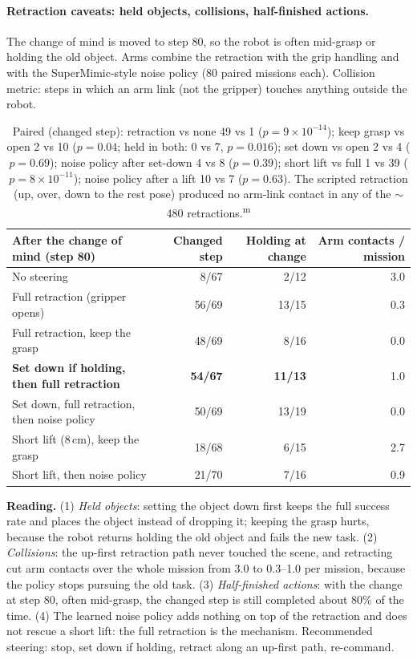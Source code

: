 \documentclass[10pt,a4paper]{article}
\DeclareRobustCommand{\meas}{\textsuperscript{\textcolor{green!50!black}{m}}}
\begin{document}
\paragraph{Retraction caveats: held objects, collisions, half-finished actions.} The change of mind is moved to step 80, so the robot is often mid-grasp or holding the old object. Arms combine the retraction with the grip handling and with the SuperMimic-style noise policy (80 paired missions each). Collision metric: steps in which an arm link (not the gripper) touches anything outside the robot.
\begin{table}[H]\centering\small
\begin{tabular}{p{6.4cm}rrr}
\toprule
After the change of mind (step 80) & Changed step & Holding at change & Arm contacts / mission \\
\midrule
No steering & 8/67 & 2/12 & 3.0 \\
Full retraction (gripper opens) & 56/69 & 13/15 & 0.3 \\
Full retraction, keep the grasp & 48/69 & 8/16 & 0.0 \\
\textbf{Set down if holding, then full retraction} & \textbf{54/67} & \textbf{11/13} & 1.0 \\
Set down, full retraction, then noise policy & 50/69 & 13/19 & 0.0 \\
Short lift (8\,cm), keep the grasp & 18/68 & 6/15 & 2.7 \\
Short lift, then noise policy & 21/70 & 7/16 & 0.9 \\
\bottomrule
\end{tabular}
\caption{Paired (changed step): retraction vs none 49 vs 1 ($p=9\times10^{-14}$); keep grasp vs open 2 vs 10 ($p=0.04$; held in both: 0 vs 7, $p=0.016$); set down vs open 2 vs 4 ($p=0.69$); noise policy after set-down 4 vs 8 ($p=0.39$); short lift vs full 1 vs 39 ($p=8\times10^{-11}$); noise policy after a lift 10 vs 7 ($p=0.63$). The scripted retraction (up, over, down to the rest pose) produced no arm-link contact in any of the $\sim$480 retractions.\meas}
\end{table}
\noindent\textbf{Reading.} (1) \emph{Held objects}: setting the object down first keeps the full success rate and places the object instead of dropping it; keeping the grasp hurts, because the robot returns holding the old object and fails the new task. (2) \emph{Collisions}: the up-first retraction path never touched the scene, and retracting cut arm contacts over the whole mission from 3.0 to 0.3--1.0 per mission, because the policy stops pursuing the old task. (3) \emph{Half-finished actions}: with the change at step 80, often mid-grasp, the changed step is still completed about 80\% of the time. (4) The learned noise policy adds nothing on top of the retraction and does not rescue a short lift: the full retraction is the mechanism. Recommended steering: stop, set down if holding, retract along an up-first path, re-command.
\end{document}
